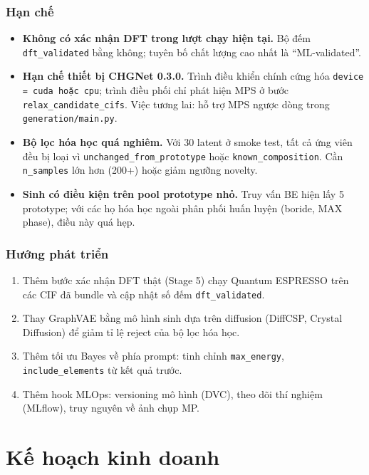 \documentclass[11pt,a4paper]{report}
\begin{document}
\section{Hạn chế}

\begin{itemize}[leftmargin=*,itemsep=2pt]
\item \textbf{Không có xác nhận DFT trong lượt chạy hiện tại.} Bộ đếm \texttt{dft\_validated}
      bằng không; tuyên bố chất lượng cao nhất là ``ML-validated''.
\item \textbf{Hạn chế thiết bị CHGNet 0.3.0.} Trình điều khiển chính cứng hóa
      \texttt{device = cuda hoặc cpu}; trình điều phối chỉ phát hiện MPS ở bước
      \texttt{relax\_candidate\_cifs}. Việc tương lai: hỗ trợ MPS ngược dòng trong
      \texttt{generation/main.py}.
\item \textbf{Bộ lọc hóa học quá nghiêm.} Với 30 latent ở smoke test, tất cả ứng viên đều
      bị loại vì \texttt{unchanged\_from\_prototype} hoặc \texttt{known\_composition}.
      Cần \texttt{n\_samples} lớn hơn (200+) hoặc giảm ngưỡng novelty.
\item \textbf{Sinh có điều kiện trên pool prototype nhỏ.} Truy vấn BE hiện lấy 5 prototype;
      với các họ hóa học ngoài phân phối huấn luyện (boride, MAX phase), điều này quá hẹp.
\end{itemize}

\section{Hướng phát triển}

\begin{enumerate}[leftmargin=*,itemsep=2pt]
\item Thêm bước xác nhận DFT thật (Stage 5) chạy Quantum ESPRESSO trên các CIF đã bundle
      và cập nhật số đếm \texttt{dft\_validated}.
\item Thay GraphVAE bằng mô hình sinh dựa trên diffusion (DiffCSP, Crystal Diffusion) để
      giảm tỉ lệ reject của bộ lọc hóa học.
\item Thêm tối ưu Bayes về phía prompt: tinh chỉnh \texttt{max\_energy},
      \texttt{include\_elements} từ kết quả trước.
\item Thêm hook MLOps: versioning mô hình (DVC), theo dõi thí nghiệm (MLflow), truy
      nguyên về ảnh chụp MP.
\end{enumerate}

\part{Kế hoạch kinh doanh}
\end{document}
